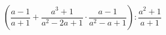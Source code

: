 \begin{ex}[type=expression]
	\begin{condition}
		\( \left( \dfrac{a-1}{a+1}+\dfrac{a^3+1}{a^2-2a+1}\cdot\dfrac{a-1}{a^2-a+1} \right):\dfrac{a^2+1}{a+1} \)
	\end{condition}
\end{ex}
